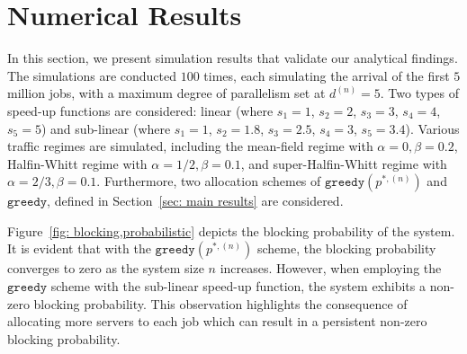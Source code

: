 \documentclass[a4paper]{article}
\theoremstyle{plain}
\theoremstyle{definition}
\theoremstyle{case}
\theoremstyle{remark}
\begin{document}
\section{Numerical Results} \label{section: numerical results}
In this section, we present simulation results that validate our analytical findings. %
The simulations are conducted $100$ times, each simulating the arrival of the first $5$ million jobs, with a maximum degree of parallelism set at $d^{(n)}=5$. Two types of speed-up functions are considered: linear (where $s_1=1$, $s_2=2$, $s_3=3$, $s_4=4$, $s_5=5$) and sub-linear (where $s_1=1$, $s_2=1.8$, $s_3=2.5$, $s_4=3$, $s_5=3.4$). Various traffic regimes are simulated, including the mean-field regime with $\alpha=0, \beta = 0.2$, Halfin-Whitt regime with $\alpha=1/2, \beta=0.1$, and super-Halfin-Whitt regime with $\alpha=2/3, \beta=0.1$. Furthermore, 
two allocation schemes of $\texttt{greedy}(p^{*,(n)})$ and $\texttt{greedy}$, defined in Section~\ref{sec: main results} are considered. %

Figure~\ref{fig: blocking,probabilistic} depicts the blocking probability of the system. It is evident that with the $\texttt{greedy}(p^{*,(n)})$ scheme, the blocking probability converges to zero as the system size $n$ increases. However, when employing the $\texttt{greedy}$ scheme with the sub-linear speed-up function, the system exhibits a non-zero blocking probability. This observation highlights the consequence of allocating more servers to each job which can result in a persistent non-zero blocking probability. %
\end{document}
